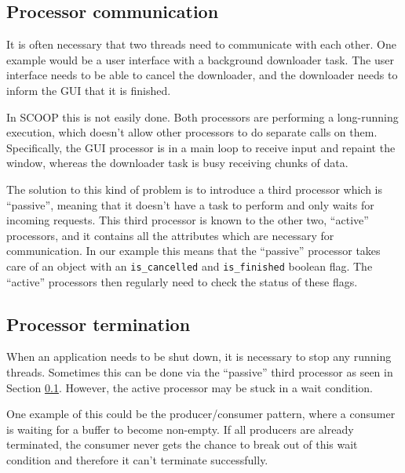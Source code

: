 \documentclass[a4paper,10pt]{article}
\begin{document}
\subsection{Processor communication}
\label{sec:processor-communication}


It is often necessary that two threads need to communicate with each other.
One example would be a user interface with a background downloader task.
The user interface needs to be able to cancel the downloader, and the downloader needs to inform the GUI that it is finished.

In SCOOP this is not easily done.
Both processors are performing a long-running execution, which doesn't allow other processors to do separate calls on them.
Specifically, the GUI processor is in a main loop to receive input and repaint the window, whereas the downloader task is busy receiving chunks of data.

The solution to this kind of problem is to introduce a third processor which is ``passive'', meaning that it doesn't have a task to perform and only waits for incoming requests.
This third processor is known to the other two, ``active'' processors, and it contains all the attributes which are necessary for communication.
In our example this means that the ``passive'' processor takes care of an object with an \lstinline!is_cancelled! and \lstinline!is_finished! boolean flag.
The ``active'' processors then regularly need to check the status of these flags.

\subsection{Processor termination}
\label{sec:processor-termination}

When an application needs to be shut down, it is necessary to stop any running threads.
Sometimes this can be done via the ``passive'' third processor as seen in Section \ref{sec:processor-communication}.
However, the active processor may be stuck in a wait condition.

One example of this could be the producer/consumer pattern, where a consumer is waiting for a buffer to become non-empty.
If all producers are already terminated, the consumer never gets the chance to break out of this wait condition and therefore it can't terminate successfully.
\end{document}
